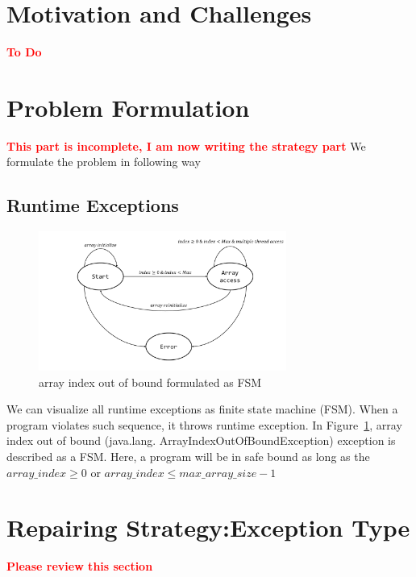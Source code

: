 \documentclass{sigplanconf}
\begin{document}
\section{Motivation and Challenges}
\label{sec:mot}

\textcolor{red}{\textbf{To Do}}\newline


\section{Problem Formulation}
\label{sec:form}

\textcolor{red}{\textbf{This part is incomplete, I am now writing the strategy part}}\newline
We formulate the problem in following way

\subsection{Runtime Exceptions}
\label{subsec:excep}

\begin{figure}[!htb]
\centering
\includegraphics[width=3.2in]{images/ArrayIndex.pdf}
\caption{array index out of bound formulated as FSM}
\label{fig:array}
\end{figure}


We can visualize all runtime exceptions as finite state machine (FSM). When a program violates such sequence, it throws runtime exception. In Figure~\ref{fig:array}, array index out of bound (java.lang. ArrayIndexOutOfBoundException) exception is described as a FSM. Here, a program will be in safe bound as long as the $array\_index \geq 0$ or $array\_index \leq max\_array\_size - 1$


\section{Repairing Strategy:Exception Type}
\label{sec:strgEx}

\textcolor{red}{\textbf{Please review this section}}\newline
\end{document}

